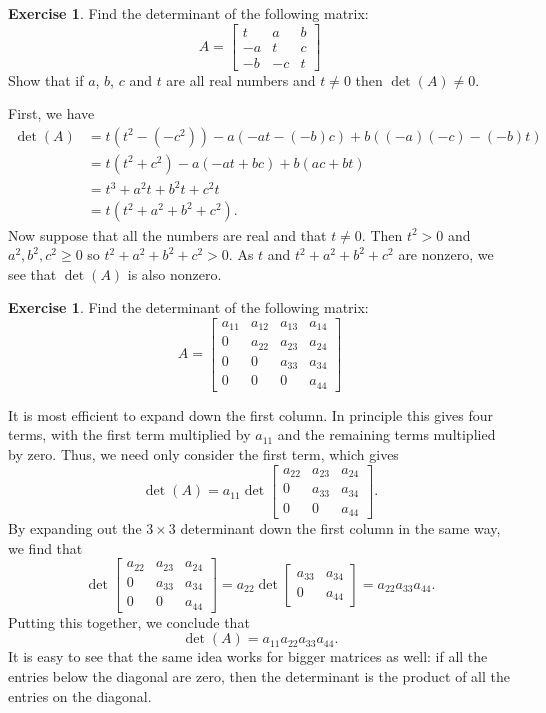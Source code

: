 \documentclass[a4paper]{book}
\newcommand{\bbm}       {\begin{bmatrix}}
\newcommand{\ebm}       {\end{bmatrix}}
\newcommand{\tm}        {\times}
\renewcommand{\:}{\colon}
\theoremstyle{definition}
\newtheorem{exercise}[theorem]{Exercise}
\renewenvironment{solution}{\SolutionInline}{\endSolutionInline}
\begin{document}
\begin{exercise}
 Find the determinant of the following matrix:
 \[ A = \bbm
          t   & a   & b   \\
          -a  & t   & c   \\
          -b  & -c  & t
        \ebm
 \]
 Show that if $a$, $b$, $c$ and $t$ are all real numbers and
 $t\neq 0$ then $\det(A)\neq 0$.
\end{exercise}
\begin{solution}
 First, we have
 \begin{align*}
  \det(A) &= t(t^2-(-c^2)) - a(-at-(-b)c) + b((-a)(-c)-(-b)t) \\
          &= t(t^2+c^2) - a(-at+bc) + b(ac+bt) \\
          &= t^3 + a^2t + b^2t + c^2t \\
          &= t(t^2+a^2+b^2+c^2).
 \end{align*}
 Now suppose that all the numbers are real and that $t\neq 0$.  Then
 $t^2>0$ and $a^2,b^2,c^2\geq 0$ so $t^2+a^2+b^2+c^2>0$.  As $t$ and
 $t^2+a^2+b^2+c^2$ are nonzero, we see that $\det(A)$ is also
 nonzero.
\end{solution}

\begin{exercise}
 Find the determinant of the following matrix:
 \[ A =
   \bbm a_{11} & a_{12} & a_{13} & a_{14} \\
        0      & a_{22} & a_{23} & a_{24} \\
        0      & 0      & a_{33} & a_{34} \\
        0      & 0      & 0      & a_{44} \ebm
 \]
\end{exercise}
\begin{solution}
 It is most efficient to expand down the first column.  In principle
 this gives four terms, with the first term multiplied by $a_{11}$ and
 the remaining terms multiplied by zero.  Thus, we need only consider
 the first term, which gives
 \[ \det(A) = a_{11}
               \det \bbm a_{22} & a_{23} & a_{24} \\
                         0      & a_{33} & a_{34} \\
                         0      & 0      & a_{44} \ebm.
 \]
 By expanding out the $3\tm 3$ determinant down the first column in
 the same way, we find that
 \[ \det \bbm a_{22} & a_{23} & a_{24} \\
              0      & a_{33} & a_{34} \\
              0      & 0      & a_{44} \ebm =
    a_{22} \det \bbm a_{33} & a_{34} \\ 0 & a_{44} \ebm =
    a_{22} a_{33} a_{44}.
 \]
 Putting this together, we conclude that
 \[ \det(A) = a_{11} a_{22} a_{33} a_{44}. \]
 It is easy to see that the same idea works for bigger matrices as
 well: if all the entries below the diagonal are zero, then the
 determinant is the product of all the entries on the diagonal.
\end{solution}
\end{document}
